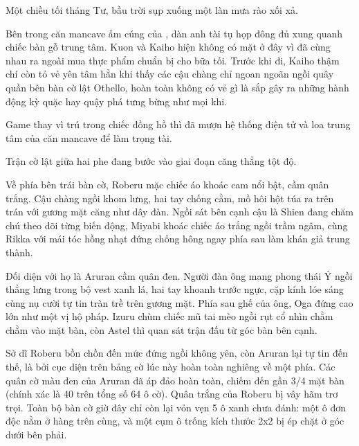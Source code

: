 \documentclass[../main.tex]{subfiles}
\begin{document}

Một chiều tối tháng Tư, bầu trời sụp xuống một làn mưa rào xối xả.

Bên trong căn mancave ấm cúng của \hls, dàn anh tài tụ họp đông đủ xung quanh chiếc bàn gỗ trung tâm. Kuon và Kaiho hiện không có mặt ở đây vì đã cùng nhau ra ngoài mua thực phẩm chuẩn bị cho bữa tối. Trước khi đi, Kaiho thậm chí còn tỏ vẻ yên tâm hẳn khi thấy các cậu chàng chỉ ngoan ngoãn ngồi quây quần bên bàn cờ lật Othello, hoàn toàn không có vẻ gì là sắp gây ra những hành động kỳ quặc hay quậy phá tưng bừng như mọi khi.

Game thay vì trú trong chiếc đồng hồ thì đã mượn hệ thống điện tử và loa trung tâm của căn mancave để làm trọng tài.

Trận cờ lật giữa hai phe đang bước vào giai đoạn căng thẳng tột độ.

Về phía bên trái bàn cờ, Roberu mặc chiếc áo khoác cam nổi bật, cầm quân trắng. Cậu chàng ngồi khom lưng, hai tay chống cằm, mồ hôi hột túa ra trên trán với gương mặt căng như dây đàn. Ngồi sát bên cạnh cậu là Shien đang chăm chú theo dõi từng biến động, Miyabi khoác chiếc áo trắng ngồi trầm ngâm, cùng Rikka với mái tóc hồng nhạt đứng chống hông ngay phía sau làm khán giả trung thành.

Đối diện với họ là Aruran cầm quân đen. Người đàn ông mang phong thái Ý ngồi thẳng lưng trong bộ vest xanh lá, hai tay khoanh trước ngực, cặp kính lóe sáng cùng nụ cười tự tin tràn trề trên gương mặt. Phía sau ghế của ông, Oga đứng cao lớn như một vị hộ pháp. Izuru chùm chiếc mũ tai mèo ngồi rụt cổ nhìn chằm chằm vào mặt bàn, còn Astel thì quan sát trận đấu từ góc bàn bên cạnh.


Sở dĩ Roberu bồn chồn đến mức đứng ngồi không yên, còn Aruran lại tự tin đến thế, là bởi cục diện trên bảng cờ lúc này hoàn toàn nghiêng về một phía. Các quân cờ màu đen của Aruran đã áp đảo hoàn toàn, chiếm đến gần 3/4 mặt bàn (chính xác là 40 trên tổng số 64 ô cờ). Quân trắng của Roberu bị vây hãm trơ trọi. Toàn bộ bàn cờ giờ đây chỉ còn lại vỏn vẹn 5 ô xanh chưa đánh: một ô đơn độc nằm ở hàng trên cùng, và một cụm ô trống kích thước 2x2 bị ép chặt ở góc dưới bên phải.
\end{document}
